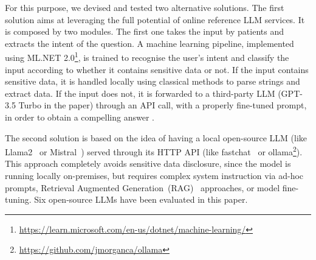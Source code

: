\documentclass[preprint,12pt]{elsarticle}
\begin{document}
For this purpose, we devised and tested two alternative solutions.
%
%
%
The first solution aims at leveraging the full potential of online reference LLM services.
%
It is composed by two modules.
%
The first one takes the input by patients and extracts the intent of the question. 
%
A machine learning pipeline, implemented using ML.NET 2.0\footnote{\url{https://learn.microsoft.com/en-us/dotnet/machine-learning/}}, is trained to recognise the user's intent and classify the input according to whether it contains sensitive data or not. 
%
If the input contains sensitive data, it is handled locally using classical methods to parse strings and extract data. 
%
If the input does not, it is forwarded to a third-party LLM (GPT-3.5 Turbo in the paper)  through an API call, with a properly fine-tuned prompt, in order to obtain a compelling answer \cite{MontagnaGoodIT2023}.
%
%
%
%
%

The second solution is based on the idea of having a local open-source LLM (like Llama2~\cite{llama2} or Mistral~\cite{mistral}) served through its HTTP API (like fastchat~\cite{fastchat} or ollama\footnote{\url{https://github.com/jmorganca/ollama}}).
%
This approach completely avoids sensitive data disclosure, since the model is running locally on-premises, but requires complex system instruction via ad-hoc prompts, Retrieval Augmented Generation~(RAG)~\cite{rag} approaches, or model fine-tuning.
%
Six open-source LLMs have been evaluated in this paper.
\end{document}
